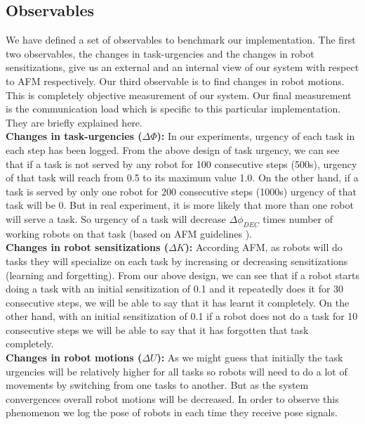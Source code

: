 \documentclass{llncs}
\begin{document}
\subsection{Observables}
We have defined a set of observables to benchmark our implementation. The first two observables, the changes in task-urgencies and the changes in robot sensitizations, give us an external and an internal view of our system with respect to AFM respectively. Our third observable is to find changes in robot motions. This is completely objective measurement of our system. Our final measurement is the communication load which is specific to this particular implementation. They are briefly explained here.\\
\textbf{Changes in task-urgencies ($\Delta \Phi$): }
In our experiments, urgency of each task in each step has been logged. From the above design of task urgency, we can see that if a task is not served by any robot for 100 consecutive steps (500s), urgency of that task will reach from 0.5 to its maximum value 1.0. On the other hand, if a task is served by only one robot for 200 consecutive steps (1000s) urgency of that task will be 0. But in real experiment, it is more likely that more than one robot will serve a task. So urgency of a task will decrease $\Delta\phi_{DEC}$ times number of working robots on that task (based on AFM guidelines \cite{Elsa}).\\ %
\textbf{Changes in robot sensitizations ($\Delta K$): }
According AFM, as robots will do tasks they will specialize on each task by increasing or decreasing sensitizations (learning and forgetting). From our above design, we can see that if a robot starts doing a task with an initial sensitization of 0.1 and it repeatedly does it for 30 consecutive steps, we will be able to say that it has learnt it completely. On the other hand, with an initial sensitization of 0.1 if a robot does not do a task for 10 consecutive steps we will be able to say that it has forgotten that task completely.\\
\textbf{Changes in robot motions ($\Delta U$): }
As we might guess that initially the task urgencies will be relatively higher for all tasks so robots will need to do a lot of movements by switching from one tasks to another. But as the system convergences overall robot motions will be decreased. In order to observe this phenomenon we log the pose of robots in each time they receive pose signals.\\
%
% 
\end{document}
